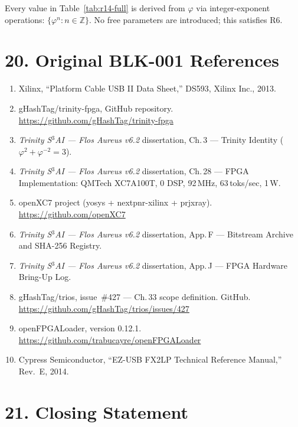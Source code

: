 Every value in Table~\ref{tab:r14-full} is derived from $\varphi$ via
integer-exponent operations: $\{\varphi^n : n \in \mathbb{Z}\}$.  No
free parameters are introduced; this satisfies R6.


\section{20. Original BLK-001 References}\label{sec:original-refs}

\begin{enumerate}
\item Xilinx, ``Platform Cable USB II Data Sheet,'' DS593, Xilinx
  Inc., 2013.
\item gHashTag/trinity-fpga, GitHub repository.
  \url{https://github.com/gHashTag/trinity-fpga}
\item \emph{Trinity S${}^3$AI — Flos Aureus v6.2} dissertation,
  Ch.\,3 --- Trinity Identity ($\varphi^2 + \varphi^{-2} = 3$).
\item \emph{Trinity S${}^3$AI — Flos Aureus v6.2} dissertation,
  Ch.\,28 --- FPGA Implementation: QMTech XC7A100T, 0 DSP, 92\,MHz,
  63\,toks/sec, 1\,W.
\item openXC7 project (yosys + nextpnr-xilinx + prjxray).
  \url{https://github.com/openXC7}
\item \emph{Trinity S${}^3$AI — Flos Aureus v6.2} dissertation,
  App.\,F --- Bitstream Archive and SHA-256 Registry.
\item \emph{Trinity S${}^3$AI — Flos Aureus v6.2} dissertation,
  App.\,J --- FPGA Hardware Bring-Up Log.
\item gHashTag/trios, issue~\#427 --- Ch.\,33 scope definition. GitHub.
  \url{https://github.com/gHashTag/trios/issues/427}
\item openFPGALoader, version 0.12.1.
  \url{https://github.com/trabucayre/openFPGALoader}
\item Cypress Semiconductor, ``EZ-USB FX2LP Technical Reference
  Manual,'' Rev.~E, 2014.
\end{enumerate}


\section{21. Closing Statement}\label{sec:closing}

